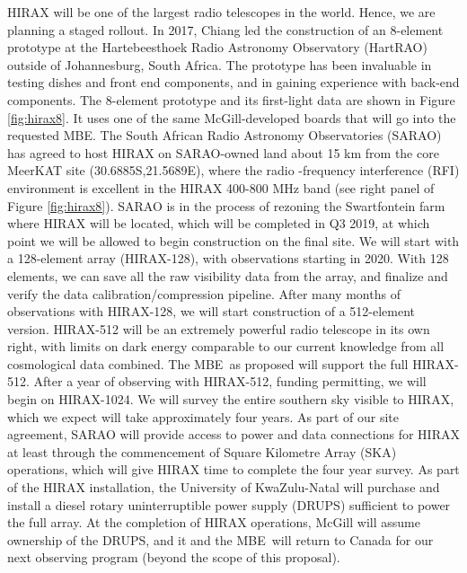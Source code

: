 \documentclass[letterpaper,11pt,preprint]{aastex}
\newcommand{\mbe}{{\rm MBE}}
\begin{document}
HIRAX will be one of the largest radio telescopes in the world.
Hence, we are planning a staged rollout.  In 2017, Chiang led the
construction of an 8-element prototype at the Hartebeesthoek Radio Astronomy Observatory
(HartRAO) outside of Johannesburg, South Africa.  The prototype has
been invaluable in testing dishes and front end components, and in
gaining experience with back-end components.  The 8-element prototype
and its first-light data are shown in Figure \ref{fig:hirax8}.  It
uses one of the same McGill-developed boards that will go into the
requested \mbe.
The South African Radio Astronomy Observatories (SARAO) has agreed to
host HIRAX on SARAO-owned land about 15 km from the core MeerKAT site
(30.6885S,21.5689E), where the radio -frequency interference (RFI)
environment is excellent in the HIRAX 400-800 MHz band (see right
panel of Figure \ref{fig:hirax8}). SARAO is in the process of rezoning
the Swartfontein farm where HIRAX will be located, which will be
completed in Q3 2019, at which point we will be allowed to begin
construction on the final site.  We will start with a 128-element
array (HIRAX-128), with observations starting in 2020.  With 128
elements, we can save all the raw visibility data from the array, and
finalize and verify the data calibration/compression pipeline. After
many months of observations with HIRAX-128, we will start construction
of a 512-element version.  HIRAX-512 will be an extremely powerful
radio telescope in its own right, with limits on dark energy
comparable to our current knowledge from all cosmological data
combined.  The \mbe\ as proposed will support the full
HIRAX-512. After a year of observing with HIRAX-512, funding
permitting, we will begin on HIRAX-1024.  We will survey the entire
southern sky visible to HIRAX, which we expect will take approximately
four years.  As part of our site agreement, SARAO will provide access to
power and data connections for HIRAX at least through the commencement
of Square Kilometre Array (SKA) operations, which will give HIRAX time to
complete the four year survey.  As part of the HIRAX
installation, the University of KwaZulu-Natal will purchase and
install a diesel rotary uninterruptible power supply (DRUPS)
sufficient to power the full array.  At the completion of HIRAX
operations, McGill will assume ownership of the DRUPS, and it and the
\mbe\ will return to Canada for our next observing program (beyond
the scope of this proposal).
\end{document}
